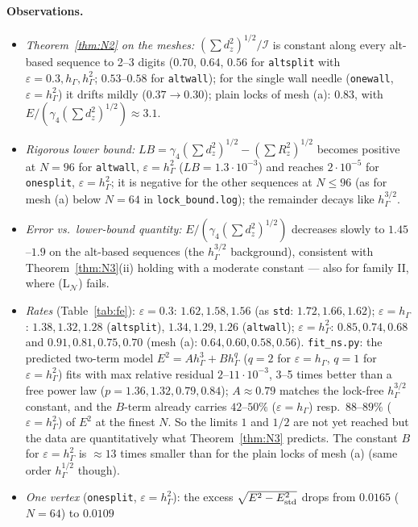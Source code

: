 \documentclass[11pt]{article}
\theoremstyle{remark}
\newcommand{\hG}{h_\Gamma}
\newcommand{\Nset}{\mathcal N}
\begin{document}
\paragraph{Observations.}
\begin{itemize}
\item \emph{Theorem~\ref{thm:N2} on the meshes:} $(\sum d_z^2)^{1/2}/\mathcal I$ is constant along every alt-based sequence to 2--3 digits
($0.70$, $0.64$, $0.56$ for \texttt{altsplit} with $\varepsilon=0.3,\hG,\hG^2$; $0.53$--$0.58$ for \texttt{altwall}); for the single
wall needle (\texttt{onewall}, $\varepsilon=\hG^2$) it drifts mildly ($0.37\to0.30$); plain locks of mesh (a): $0.83$, with $E/(\gamma_4(\sum d_z^2)^{1/2})\approx3.1$.
\item \emph{Rigorous lower bound:} $LB=\gamma_4(\sum d_z^2)^{1/2}-(\sum R_z^2)^{1/2}$ becomes positive at $N=96$ for
\texttt{altwall}, $\varepsilon=\hG^2$ ($LB=1.3\cdot10^{-3}$) and reaches $2\cdot10^{-5}$ for \texttt{onesplit}, $\varepsilon=\hG^2$; it is negative
for the other sequences at $N\le96$ (as for mesh (a) below $N=64$ in \texttt{lock\_bound.log}); the remainder decays like $\hG^{3/2}$.
\item \emph{Error vs.\ lower-bound quantity:} $E/(\gamma_4(\sum d_z^2)^{1/2})$ decreases slowly to $1.45$--$1.9$ on the alt-based
sequences (the $\hG^{3/2}$ background), consistent with Theorem~\ref{thm:N3}(ii) holding with a moderate constant --- also for
family II, where (L$_\Nset$) fails.
\item \emph{Rates} (Table~\ref{tab:fe}): $\varepsilon=0.3$: $1.62,1.58,1.56$ (as \texttt{std}: $1.72,1.66,1.62$); $\varepsilon=\hG$:
$1.38,1.32,1.28$ (\texttt{altsplit}), $1.34,1.29,1.26$ (\texttt{altwall}); $\varepsilon=\hG^2$: $0.85,0.74,0.68$ and $0.91,0.81,0.75,0.70$
(mesh (a): $0.64,0.60,0.58,0.56$). \texttt{fit\_ns.py}: the predicted two-term model $E^2=A\hG^3+B\hG^q$ ($q=2$ for $\varepsilon=\hG$,
$q=1$ for $\varepsilon=\hG^2$) fits with max relative residual $2$--$11\cdot10^{-3}$, 3--5 times better than a free power law
($p=1.36,1.32,0.79,0.84$); $A\approx0.79$ matches the lock-free $\hG^{3/2}$ constant, and the $B$-term already carries $42$--$50\%$
($\varepsilon=\hG$) resp.\ $88$--$89\%$ ($\varepsilon=\hG^2$) of $E^2$ at the finest $N$. So the limits $1$ and $1/2$ are not yet reached
but the data are quantitatively what Theorem~\ref{thm:N3} predicts. The constant $B$ for $\varepsilon=\hG^2$ is $\approx13$ times smaller than
for the plain locks of mesh (a) (same order $\hG^{1/2}$ though).
\item \emph{One vertex} (\texttt{onesplit}, $\varepsilon=\hG^2$): the excess $\sqrt{E^2-E_{\rm std}^2}$ drops from $0.0165$ ($N=64$) to $0.0109$

\end{itemize}
\end{document}
